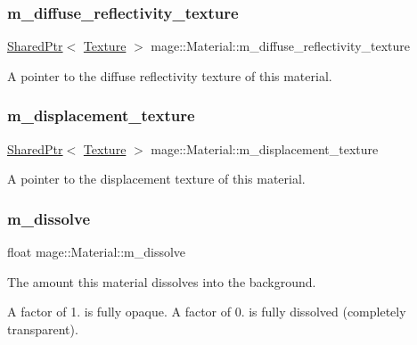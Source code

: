 \subsubsection{\texorpdfstring{m\+\_\+diffuse\+\_\+reflectivity\+\_\+texture}{m\_diffuse\_reflectivity\_texture}}
{\footnotesize\ttfamily \hyperlink{namespacemage_a1e01ae66713838a7a67d30e44c67703e}{Shared\+Ptr}$<$ \hyperlink{classmage_1_1_texture}{Texture} $>$ mage\+::\+Material\+::m\+\_\+diffuse\+\_\+reflectivity\+\_\+texture\hspace{0.3cm}{\ttfamily [private]}}

A pointer to the diffuse reflectivity texture of this material. \hypertarget{structmage_1_1_material_a04ca0a2efe12529ae0ea91e9cb622ade}{}\label{structmage_1_1_material_a04ca0a2efe12529ae0ea91e9cb622ade} 
\subsubsection{\texorpdfstring{m\+\_\+displacement\+\_\+texture}{m\_displacement\_texture}}
{\footnotesize\ttfamily \hyperlink{namespacemage_a1e01ae66713838a7a67d30e44c67703e}{Shared\+Ptr}$<$ \hyperlink{classmage_1_1_texture}{Texture} $>$ mage\+::\+Material\+::m\+\_\+displacement\+\_\+texture\hspace{0.3cm}{\ttfamily [private]}}

A pointer to the displacement texture of this material. \hypertarget{structmage_1_1_material_a42b435ea58ce7da4b48febe9bb33aba7}{}\label{structmage_1_1_material_a42b435ea58ce7da4b48febe9bb33aba7} 
\subsubsection{\texorpdfstring{m\+\_\+dissolve}{m\_dissolve}}
{\footnotesize\ttfamily float mage\+::\+Material\+::m\+\_\+dissolve\hspace{0.3cm}{\ttfamily [private]}}

The amount this material dissolves into the background.

A factor of 1. is fully opaque. A factor of 0. is fully dissolved (completely transparent).

